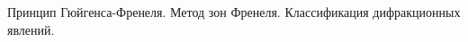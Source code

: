 \documentclass[__main__.tex]{subfiles}
\begin{document}
Принцип Гюйгенса-Френеля. Метод зон Френеля. Классификация дифракционных явлений.\\ 

\end{document}

